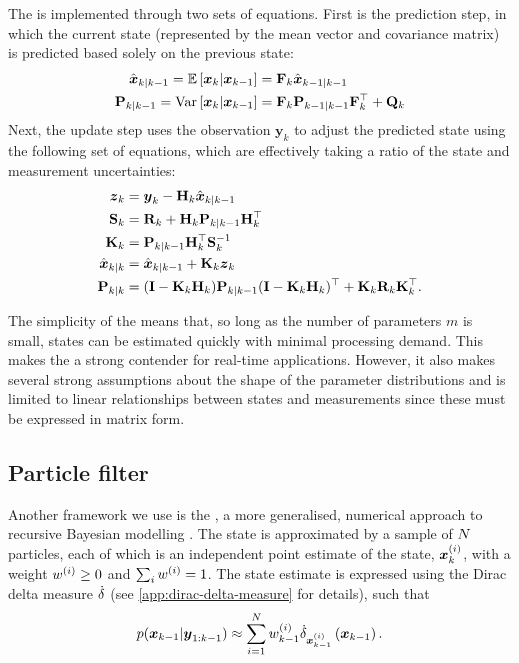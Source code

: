 The \kf{} is implemented through two sets of equations. First is the prediction step, in which the current state (represented by the mean vector and covariance matrix) is predicted based solely on the previous state:
\begin{equation}
\label{eq:ch2:kf_predict}
\begin{split}
\hat{\boldsymbol x}_{k|k-1} = \mathbb{E}\left[\boldsymbol x_k | \boldsymbol x_{k-1}\right]
    &= \mathbf{F}_k \hat{\boldsymbol x}_{k-1|k-1} \\
\mathbf{P}_{k|k-1} = \mathrm{Var}\left[\boldsymbol x_k | \boldsymbol x_{k-1}\right]
    &= \mathbf{F}_k \mathbf{P}_{k-1|k-1} \mathbf{F}_k^\top + \mathbf{Q}_k
\end{split}
\end{equation}
Next, the update step uses the observation $\boldsymbol{y}_k$ to adjust the predicted state using the following set of equations, which are effectively taking a ratio of the state and measurement uncertainties:
\begin{equation}
\label{eq:ch2:kf_update}
\begin{split}
\boldsymbol z_k &= \boldsymbol{y}_k - \mathbf{H}_k \hat{\boldsymbol x}_{k|k-1} \\
\mathbf{S}_k &= \mathbf{R}_k + \mathbf{H}_k \mathbf{P}_{k|k-1} \mathbf{H}_k^\top \\
\mathbf{K}_k &= \mathbf{P}_{k|k-1} \mathbf{H}_k^\top \mathbf{S}_k^{-1} \\
\hat{\boldsymbol x}_{k|k} &= \hat{\boldsymbol x}_{k|k-1} + \mathbf{K}_k \boldsymbol z_k \\
\mathbf{P}_{k|k} &= (\mathbf{I} - \mathbf{K}_k \mathbf{H}_k) \mathbf{P}_{k|k-1}
    (\mathbf{I} - \mathbf{K}_k \mathbf{H}_k)^\top + \mathbf{K}_k \mathbf{R}_k \mathbf{K}_k^\top.
\end{split}
\end{equation}


The simplicity of the \kf{} means that, so long as the number of parameters $m$ is small, states can be estimated quickly with minimal processing demand. This makes the \kf{} a strong contender for real-time applications. However, it also makes several strong assumptions about the shape of the parameter distributions and is limited to linear relationships between states and measurements since these must be expressed in matrix form.



\subsection{Particle filter}
\label{sec:pf}

Another framework we use is the \pf{}, a more generalised, numerical approach to recursive Bayesian modelling \citep{Gordon_1993}. The state is approximated by a sample of $N$ particles, each of which is an independent point estimate of the state, $\boldsymbol x^{(i)}_k$, with a weight $w^{(i)} \geq 0$ and $\sum_i w^{(i)} = 1$. The state estimate is expressed using the Dirac delta measure $\dot\delta$ (see \cref{app:dirac-delta-measure} for details), such that
\begin{equation}
\label{eq:pf_state}
p(\boldsymbol x_{k-1} | \boldsymbol{y}_{1:k-1}) \approx
\sum_{i=1}^N w^{(i)}_{k-1} \dot\delta_{\boldsymbol x^{(i)}_{k-1}}\left(\boldsymbol x_{k-1}\right).
\end{equation}

